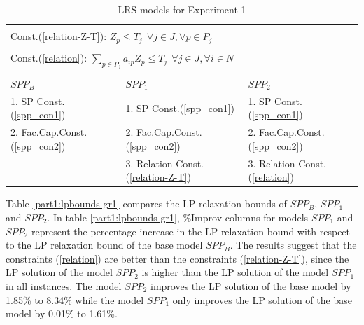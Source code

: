 \begin{table}[h]
\centering
\caption{LRS models for Experiment 1}\label{part1:formulations-gr1}
\begin {tabular}[t]{|l|l|l|}  
\multicolumn{3}{l}{\mbox{}}\\
\multicolumn{3}{l}{Const.(\ref{relation-Z-T}): $Z_{p} \leq T_{j} \ \ \forall j \in J, \forall p \in P_{j}$}\\
\multicolumn{3}{l}{\mbox{}}\\
\multicolumn{3}{l}{Const.(\ref{relation}): $\sum_{p \in P_{j}}a_{ip}Z_{p} \leq T_{j} \ \ \forall j \in J, \forall i \in N$}\\  
\multicolumn{3}{l}{\mbox{}}\\
\hline
$SPP_B$ & $SPP_1$ & $SPP_2$ \\\hline
1. SP Const.(\ref{spp_con1}) & 1. SP Const.(\ref{spp_con1}) & 1. SP Const.(\ref{spp_con1}) \\
2. Fac.Cap.Const.(\ref{spp_con2}) & 2. Fac.Cap.Const.(\ref{spp_con2}) & 2. Fac.Cap.Const.(\ref{spp_con2}) \\
\mbox{}  & 3. Relation Const.(\ref{relation-Z-T}) &  3. Relation Const.(\ref{relation})\\\hline
\end{tabular}
\end{table}

Table \ref{part1:lpbounds-gr1} compares the LP relaxation bounds of $SPP_B$, $SPP_1$ and $SPP_2$. In table 
\ref{part1:lpbounds-gr1}, \%Improv columns for models $SPP_1$ and $SPP_2$ represent the percentage increase
in the LP relaxation bound with respect to the LP relaxation bound of the base model $SPP_B$. The results 
suggest that 
the constraints (\ref{relation}) are better than the constraints (\ref{relation-Z-T}), since
the LP solution of the model $SPP_2$ is higher than the LP solution of the model $SPP_1$ in all
instances. The model $SPP_2$ improves the LP solution of the base model by 1.85\% to 8.34\% 
while the model $SPP_1$ only improves the LP solution of the base model by 0.01\% to 1.61\%.   


